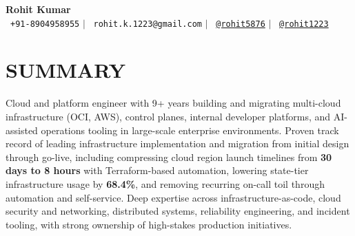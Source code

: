 \documentclass[letterpaper,11pt]{article}
\begin{document}
\begin{center}
    \textbf{\Huge Rohit Kumar} \\ \vspace{5pt}
    \small \faPhone*\ \texttt{+91-8904958955} \hspace{1pt} $|$
    \hspace{1pt} \faEnvelope\ \texttt{rohit.k.1223@gmail.com} \hspace{1pt} $|$
    \hspace{1pt} \faLinkedin\ \href{https://www.linkedin.com/in/rohit5876}{\texttt{@rohit5876}} \hspace{1pt} $|$
    \hspace{1pt} \faGithub\ \href{https://github.com/rohit1223}{\texttt{@rohit1223}} \hspace{1pt} \\ \vspace{-3pt}
\end{center}

\section{SUMMARY}
\begin{itemize}[leftmargin=0in, label={}]
    \small{\item{Cloud and platform engineer with 9+ years building and migrating multi-cloud infrastructure (OCI, AWS), control planes, internal developer platforms, and AI-assisted operations tooling in large-scale enterprise environments. Proven track record of leading infrastructure implementation and migration from initial design through go-live, including compressing cloud region launch timelines from \textbf{30 days to 8 hours} with Terraform-based automation, lowering state-tier infrastructure usage by \textbf{68.4\%}, and removing recurring on-call toil through automation and self-service. Deep expertise across infrastructure-as-code, cloud security and networking, distributed systems, reliability engineering, and incident tooling, with strong ownership of high-stakes production initiatives.}}
\end{itemize}

\end{document}
